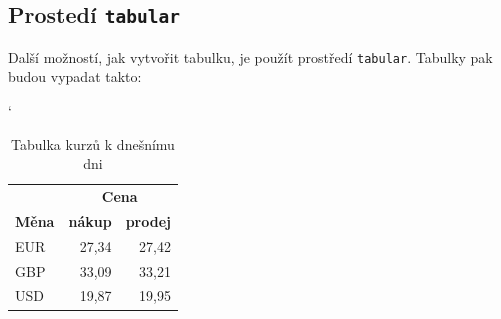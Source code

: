 \documentclass[a4paper, 11pt]{article}
\begin{document}
\subsection{Prostedí \texttt{tabular}}

Další možností, jak vytvořit tabulku, je použít prostředí \texttt{tabular}. Tabulky pak budou vypadat takto\footnotemark[1]:

\begin{table}[h]

	\begin{center}
	\catcode `

	\begin{tabular}{|l|r|r|}
	\hline

		\hline
		& \multicolumn{2}{|c|}{\textbf{Cena}} \\
		\cline{2-3}
		
		\textbf{Měna} & \textbf{nákup} & \textbf{prodej} \\
		\hline
		EUR & 27,34 & 27,42 \\
		GBP & 33,09 & 33,21 \\
		USD & 19,87 & 19,95 \\
		\hline
	\end{tabular}

	\caption{Tabulka kurzů k dnešnímu dni}
	\label{tabulka1}


	\end{center}


\end{table}
\end{document}
